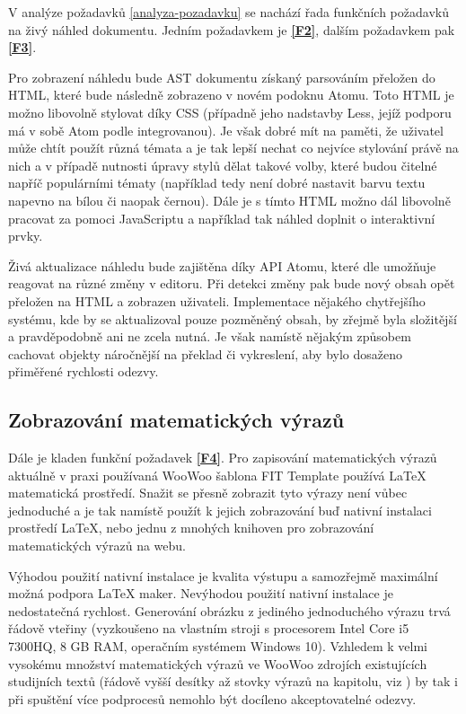 V analýze požadavků \ref{analyza-pozadavku} se nachází řada funkčních požadavků na živý náhled dokumentu. Jedním
požadavkem je \textbf{\ref{F2}}, dalším požadavkem pak \textbf{\ref{F3}}.

Pro zobrazení náhledu bude AST dokumentu získaný parsováním přeložen do HTML, které bude následně zobrazeno v novém
podoknu Atomu. Toto HTML je možno libovolně stylovat díky CSS (případně jeho nadstavby Less, jejíž podporu má v sobě
Atom podle \cite{atom-docs} integrovanou). Je však dobré mít na paměti, že uživatel může chtít použít různá témata a je
tak lepší nechat co nejvíce stylování právě na nich a v případě nutnosti úpravy stylů dělat takové volby, které budou
čitelné napříč populárními tématy (například tedy není dobré nastavit barvu textu napevno na bílou či naopak černou).
Dále je s tímto HTML možno dál libovolně pracovat za pomoci JavaScriptu a například tak náhled doplnit o interaktivní
prvky.

Živá aktualizace náhledu bude zajištěna díky API Atomu, které dle \cite{atom-docs} umožňuje reagovat na různé změny v
editoru. Při detekci změny pak bude nový obsah opět přeložen na HTML a zobrazen uživateli. Implementace nějakého
chytřejšího systému, kde by se aktualizoval pouze pozměněný obsah, by zřejmě byla složitější a pravděpodobně ani ne
zcela nutná. Je však namístě nějakým způsobem cachovat objekty náročnější na překlad či vykreslení, aby bylo dosaženo
přiměřené rychlosti odezvy.

\subsection{Zobrazování matematických výrazů}

Dále je kladen funkční požadavek \textbf{\ref{F4}}. Pro zapisování matematických výrazů aktuálně v praxi používaná
WooWoo šablona FIT Template používá \LaTeX{} matematická prostředí. Snažit se přesně zobrazit tyto výrazy není vůbec
jednoduché a je tak namístě použít k jejich zobrazování buď nativní instalaci prostředí \LaTeX{}, nebo jednu z mnohých
knihoven pro zobrazování matematických výrazů na webu.

Výhodou použití nativní instalace je kvalita výstupu a samozřejmě maximální možná podpora \LaTeX{} maker. Nevýhodou
použití nativní instalace je nedostatečná rychlost. Generování obrázku z jediného jednoduchého výrazu trvá řádově
vteřiny (vyzkoušeno na vlastním stroji s procesorem Intel Core i5 7300HQ, 8 GB RAM, operačním systémem Windows 10).
Vzhledem k velmi vysokému množství matematických výrazů ve WooWoo zdrojích existujících studijních textů (řádově vyšší
desítky až stovky výrazů na kapitolu, viz \cite{pkm}) by tak i při spuštění více podprocesů nemohlo být docíleno
akceptovatelné odezvy.

